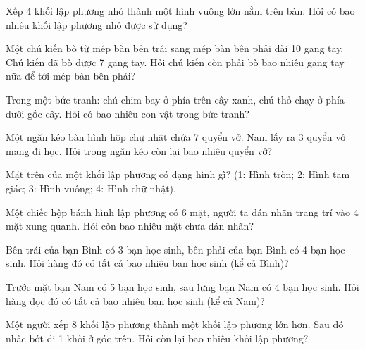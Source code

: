 \begin{ex}
Xếp 4 khối lập phương nhỏ thành một hình vuông lớn nằm trên bàn. Hỏi có bao nhiêu khối lập phương nhỏ được sử dụng?
\end{ex}

\begin{ex}
Một chú kiến bò từ mép bàn bên trái sang mép bàn bên phải dài 10 gang tay. Chú kiến đã bò được 7 gang tay. Hỏi chú kiến còn phải bò bao nhiêu gang tay nữa để tới mép bàn bên phải?
\end{ex}

\begin{ex}
Trong một bức tranh: chú chim bay ở phía trên cây xanh, chú thỏ chạy ở phía dưới gốc cây. Hỏi có bao nhiêu con vật trong bức tranh?
\end{ex}

\begin{ex}
Một ngăn kéo bàn hình hộp chữ nhật chứa 7 quyển vở. Nam lấy ra 3 quyển vở mang đi học. Hỏi trong ngăn kéo còn lại bao nhiêu quyển vở?
\end{ex}

\begin{ex}
Mặt trên của một khối lập phương có dạng hình gì? (1: Hình tròn; 2: Hình tam giác; 3: Hình vuông; 4: Hình chữ nhật).
\end{ex}

\begin{ex}
Một chiếc hộp bánh hình lập phương có 6 mặt, người ta dán nhãn trang trí vào 4 mặt xung quanh. Hỏi còn bao nhiêu mặt chưa dán nhãn?
\end{ex}

\begin{ex}
Bên trái của bạn Bình có 3 bạn học sinh, bên phải của bạn Bình có 4 bạn học sinh. Hỏi hàng đó có tất cả bao nhiêu bạn học sinh (kể cả Bình)?
\end{ex}

\begin{ex}
Trước mặt bạn Nam có 5 bạn học sinh, sau lưng bạn Nam có 4 bạn học sinh. Hỏi hàng dọc đó có tất cả bao nhiêu bạn học sinh (kể cả Nam)?
\end{ex}

\begin{ex}
Một người xếp 8 khối lập phương thành một khối lập phương lớn hơn. Sau đó nhấc bớt đi 1 khối ở góc trên. Hỏi còn lại bao nhiêu khối lập phương?
\end{ex}
